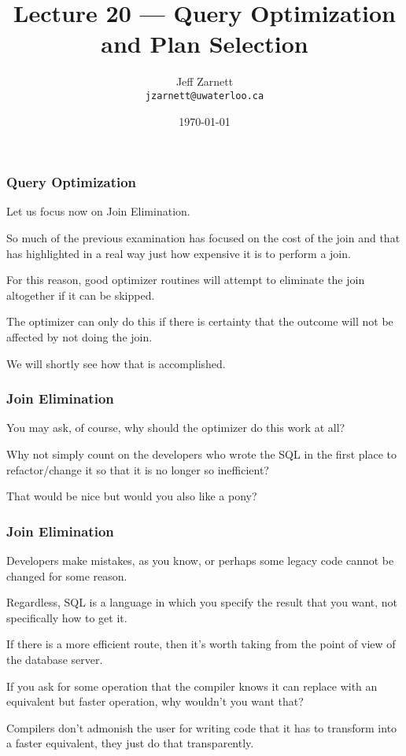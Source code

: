 

\title{Lecture 20 --- Query Optimization and Plan Selection}

\author{Jeff Zarnett \\ \small \texttt{jzarnett@uwaterloo.ca}}
\date{\today}




\begin{frame}
  \titlepage

 \end{frame}

\begin{frame}
\frametitle{Query Optimization}

Let us focus now on \alert{Join Elimination}.

So much of the previous examination has focused on the cost of the join and that has highlighted in a real way just how expensive it is to perform a join. 

For this reason, good optimizer routines will attempt to eliminate the join altogether if it can be skipped. 

The optimizer can only do this if there is certainty that the outcome will not be affected by not doing the join. 

We will shortly see how that is accomplished.


\end{frame}

\begin{frame}
\frametitle{Join Elimination}

You may ask, of course, why should the optimizer do this work at all? 

Why not simply count on the developers who wrote the SQL in the first place to refactor/change it so that it is no longer so inefficient? 

That would be nice but would you also like a pony? 

\end{frame}

\begin{frame}
\frametitle{Join Elimination}

Developers make mistakes, as you know, or perhaps some legacy code cannot be changed for some reason. 

Regardless, SQL is a language in which you specify the result that you want, not specifically how to get it. 

If there is a more efficient route, then it's worth taking from the point of view of the database server. 

If you ask for some operation that the compiler knows it can replace with an equivalent but faster operation, why wouldn't you want that? 

Compilers don't admonish the user for writing code that it has to transform into a faster equivalent, they just do that transparently.


\end{frame}


